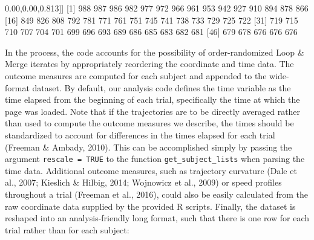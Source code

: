 \documentclass[]{article}
\newenvironment{Shaded}{\begin{snugshade}}{\end{snugshade}}
\newcommand{\DecValTok}[1]{\textcolor[rgb]{0.00,0.00,0.81}{#1}}
\newcommand{\NormalTok}[1]{#1}
\begin{document}
\begin{Shaded}
\begin{Highlighting}[]
\NormalTok{[[}\DecValTok{3}\NormalTok{]]}
\NormalTok{ [}\DecValTok{1}\NormalTok{] }\DecValTok{988} \DecValTok{987} \DecValTok{986} \DecValTok{982} \DecValTok{977} \DecValTok{972} \DecValTok{966} \DecValTok{961} \DecValTok{953} \DecValTok{942} \DecValTok{927} \DecValTok{910} \DecValTok{894} \DecValTok{878} \DecValTok{866}
\NormalTok{[}\DecValTok{16}\NormalTok{] }\DecValTok{849} \DecValTok{826} \DecValTok{808} \DecValTok{792} \DecValTok{781} \DecValTok{771} \DecValTok{761} \DecValTok{751} \DecValTok{745} \DecValTok{741} \DecValTok{738} \DecValTok{733} \DecValTok{729} \DecValTok{725} \DecValTok{722}
\NormalTok{[}\DecValTok{31}\NormalTok{] }\DecValTok{719} \DecValTok{715} \DecValTok{710} \DecValTok{707} \DecValTok{704} \DecValTok{701} \DecValTok{699} \DecValTok{696} \DecValTok{693} \DecValTok{689} \DecValTok{686} \DecValTok{685} \DecValTok{683} \DecValTok{682} \DecValTok{681}
\NormalTok{[}\DecValTok{46}\NormalTok{] }\DecValTok{679} \DecValTok{678} \DecValTok{676} \DecValTok{676} \DecValTok{676}
\end{Highlighting}
\end{Shaded}

In the process, the code accounts for the possibility of
order-randomized Loop \& Merge iterates by appropriately reordering the
coordinate and time data. The outcome measures are computed for each
subject and appended to the wide-format dataset. By default, our
analysis code defines the time variable as the time elapsed from the
beginning of each trial, specifically the time at which the page was
loaded. Note that if the trajectories are to be directly averaged rather
than used to compute the outcome measures we describe, the times should
be standardized to account for differences in the times elapsed for each
trial (Freeman \& Ambady, 2010). This can be accomplished simply by
passing the argument \texttt{rescale\ =\ TRUE} to the function
\texttt{get\_subject\_lists} when parsing the time data. Additional
outcome measures, such as trajectory curvature (Dale et al., 2007;
Kieslich \& Hilbig, 2014; Wojnowicz et al., 2009) or speed profiles
throughout a trial (Freeman et al., 2016), could also be easily
calculated from the raw coordinate data supplied by the provided R
scripts. Finally, the dataset is reshaped into an analysis-friendly long
format, such that there is one row for each trial rather than for each
subject:
\end{document}
